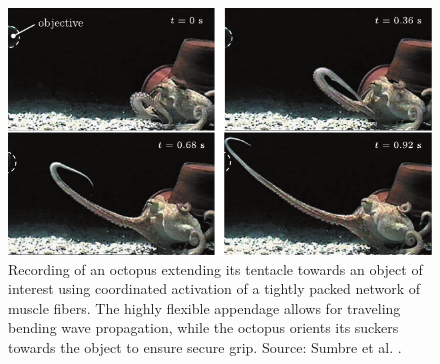 \begin{figure}
  \centering
  \includegraphics*[width = .75\textwidth]{./pdf/thesis-figure-1-1.pdf}
  \caption{\small Recording of an octopus extending its tentacle towards an object of interest using coordinated activation of a tightly packed network of muscle fibers. The highly flexible appendage allows for traveling bending wave propagation, while the octopus orients its suckers towards the object to ensure secure grip. Source: Sumbre et al. \cite{Sumbre2001Sep}. \label{fig:C0:octopus}}
  \vspace{-6mm}
\end{figure}

